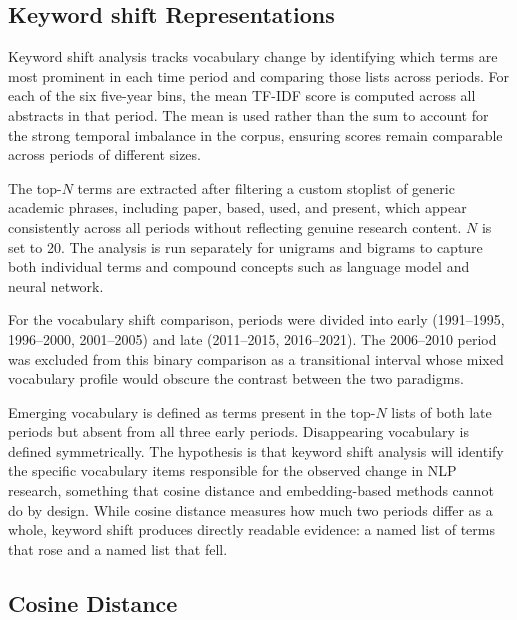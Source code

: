 
\subsection{Keyword shift Representations}

Keyword shift analysis tracks vocabulary change by identifying which terms are most prominent in each time period and comparing those lists across periods. For each of the six five-year bins, the mean TF-IDF score is computed across all abstracts in that period. The mean is used rather than the sum to account for the strong temporal imbalance in the corpus, ensuring scores remain comparable across periods of different sizes.

The top-$N$ terms are extracted after filtering a custom stoplist of generic academic phrases, including paper, based, used, and present, which appear consistently across all periods without reflecting genuine research content. $N$ is set to 20. The analysis is run separately for unigrams and bigrams to capture both individual terms and compound concepts such as language model and neural network.

For the vocabulary shift comparison, periods were divided into early (1991--1995, 1996--2000, 2001--2005) and late (2011--2015, 2016--2021). The 2006--2010 period was excluded from this binary comparison as a transitional interval whose mixed vocabulary profile would obscure the contrast between the two paradigms.

Emerging vocabulary is defined as terms present in the top-$N$ lists of both late periods but absent from all three early periods. Disappearing vocabulary is defined symmetrically. The hypothesis is that keyword shift analysis will identify the specific vocabulary items responsible for the observed change in NLP research, something that cosine distance and embedding-based methods cannot do by design. While cosine distance measures how much two periods differ as a whole, keyword shift produces directly readable evidence: a named list of terms that rose and a named list that fell.



\subsection{Cosine Distance}
\label{sec:methods-axis2}

